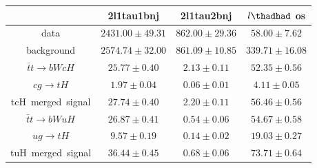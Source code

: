 \begin{tabular}{|c|c|c|c|} \hline
 & 2l1tau1bnj   & 2l1tau2bnj   & $l\thadhad$ os\\\hline
data & $2431.00\pm49.31$ & $862.00\pm29.36$ & $58.00\pm7.62$\\\hline
background & $2574.74\pm32.00$ & $861.09\pm10.85$ & $339.71\pm16.08$\\\hline
$\bar{t}t\to bWcH$ & $25.77\pm0.40$ & $2.13\pm0.11$ & $52.35\pm0.56$\\\hline
$cg\to tH$ & $1.97\pm0.04$ & $0.06\pm0.01$ & $4.11\pm0.05$\\\hline
tcH~merged~signal & $27.74\pm0.40$ & $2.20\pm0.11$ & $56.46\pm0.56$\\\hline
$\bar{t}t\to bWuH$ & $26.87\pm0.41$ & $0.54\pm0.06$ & $54.67\pm0.58$\\\hline
$ug\to tH$ & $9.57\pm0.19$ & $0.14\pm0.02$ & $19.03\pm0.27$\\\hline
tuH~merged~signal & $36.44\pm0.45$ & $0.68\pm0.06$ & $73.71\pm0.64$\\\hline
\end{tabular}
